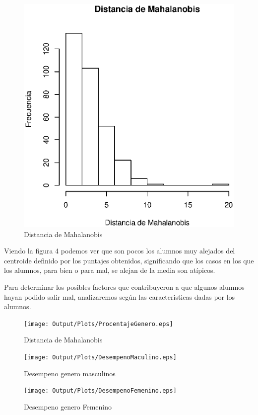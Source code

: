 \documentclass{article}
\begin{document}
\begin{figure}[H]
    \centering
    \includegraphics[scale = 0.9]{Output/Plots/DistanciaMahalanobis.eps}
    \caption{Distancia de Mahalanobis}
\end{figure}

Viendo la figura 4 podemos ver que son pocos los alumnos muy alejados del centroide definido por los puntajes obtenidos,
significando que los casos en los que los alumnos, para bien o para mal, se alejan de la media son at\'ipicos.

Para determinar los posibles factores que contribuyeron a que algunos alumnos hayan podido salir mal, analizaremos seg\'un
las caracteristicas dadas por los alumnos.

\begin{figure}[H]
    \centering
    \texttt{[image: Output/Plots/ProcentajeGenero.eps]}
    \caption{Distancia de Mahalanobis}
\end{figure}
\begin{figure}[ht]
    \centering
    \begin{minipage}[b]{0.45\linewidth}
        \texttt{[image: Output/Plots/DesempenoMaculino.eps]}
        \caption{Desempeno genero masculinos}
        \label{fig:minipage1}
    \end{minipage}
    \hspace{0.2cm}
    \begin{minipage}[b]{0.45\linewidth}
        \texttt{[image: Output/Plots/DesempenoFemenino.eps]}
        \caption{Desempeno genero Femenino}
        \label{fig:minipage2}
    \end{minipage}
\end{figure}
\end{document}
